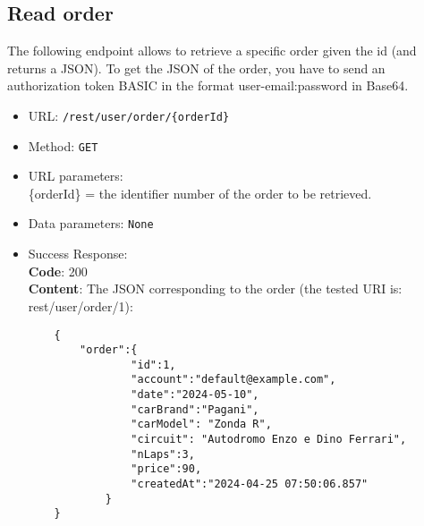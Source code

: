 \subsection*{Read order}

The following endpoint allows to retrieve a specific order given the id (and returns a JSON). To get the JSON of the order, you have to send an authorization token BASIC in the format user-email:password in Base64.

\begin{itemize}
	\item URL: \texttt{/rest/user/order/\{orderId\}}
	\item Method: \texttt{GET}
	\item URL parameters:
		\\\{orderId\} = the identifier number of the order to be retrieved.
	\item Data parameters: \texttt{None}
	\item Success Response: \\
	\textbf{Code}: 200\\
	\textbf{Content}: The JSON corresponding to the order (the tested URI is: rest/user/order/1):
	\\\begin{verbatim}
	{
		"order":{
				"id":1,
				"account":"default@example.com",
				"date":"2024-05-10",
				"carBrand":"Pagani",
				"carModel": "Zonda R",
				"circuit": "Autodromo Enzo e Dino Ferrari",
				"nLaps":3,
				"price":90,
				"createdAt":"2024-04-25 07:50:06.857"
			}
	}
	\end{verbatim}


\end{itemize}
